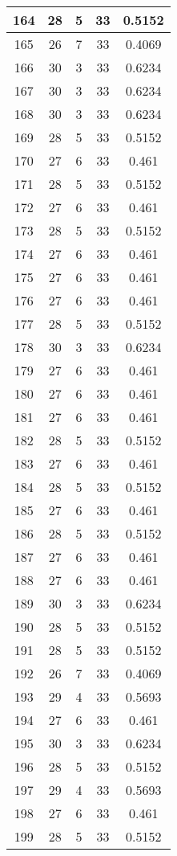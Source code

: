 \documentclass[letterpaper, 12pt]{article}
\begin{document}
\begin{longtable}{|c|c|c|c|c|}
\hline
164 & 28 & 5 & 33 & 0.5152 \\
\hline
165 & 26 & 7 & 33 & 0.4069 \\
\hline
166 & 30 & 3 & 33 & 0.6234 \\
\hline
167 & 30 & 3 & 33 & 0.6234 \\
\hline
168 & 30 & 3 & 33 & 0.6234 \\
\hline
169 & 28 & 5 & 33 & 0.5152 \\
\hline
170 & 27 & 6 & 33 & 0.461 \\
\hline
171 & 28 & 5 & 33 & 0.5152 \\
\hline
172 & 27 & 6 & 33 & 0.461 \\
\hline
173 & 28 & 5 & 33 & 0.5152 \\
\hline
174 & 27 & 6 & 33 & 0.461 \\
\hline
175 & 27 & 6 & 33 & 0.461 \\
\hline
176 & 27 & 6 & 33 & 0.461 \\
\hline
177 & 28 & 5 & 33 & 0.5152 \\
\hline
178 & 30 & 3 & 33 & 0.6234 \\
\hline
179 & 27 & 6 & 33 & 0.461 \\
\hline
180 & 27 & 6 & 33 & 0.461 \\
\hline
181 & 27 & 6 & 33 & 0.461 \\
\hline
182 & 28 & 5 & 33 & 0.5152 \\
\hline
183 & 27 & 6 & 33 & 0.461 \\
\hline
184 & 28 & 5 & 33 & 0.5152 \\
\hline
185 & 27 & 6 & 33 & 0.461 \\
\hline
186 & 28 & 5 & 33 & 0.5152 \\
\hline
187 & 27 & 6 & 33 & 0.461 \\
\hline
188 & 27 & 6 & 33 & 0.461 \\
\hline
189 & 30 & 3 & 33 & 0.6234 \\
\hline
190 & 28 & 5 & 33 & 0.5152 \\
\hline
191 & 28 & 5 & 33 & 0.5152 \\
\hline
192 & 26 & 7 & 33 & 0.4069 \\
\hline
193 & 29 & 4 & 33 & 0.5693 \\
\hline
194 & 27 & 6 & 33 & 0.461 \\
\hline
195 & 30 & 3 & 33 & 0.6234 \\
\hline
196 & 28 & 5 & 33 & 0.5152 \\
\hline
197 & 29 & 4 & 33 & 0.5693 \\
\hline
198 & 27 & 6 & 33 & 0.461 \\
\hline
199 & 28 & 5 & 33 & 0.5152 \\
\hline
\end{longtable}
\end{document}
